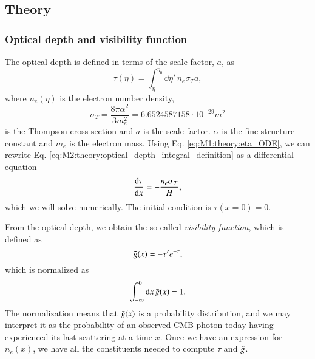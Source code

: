 

\subsection{Theory}\label{ssec:M2:theory}

\subsubsection{Optical depth and visibility function} \label{sssec:M2:optical_depth_and_visibility_function}

The optical depth is defined in terms of the scale factor, $a$, as 
\begin{equation} \label{eq:M2:theory:optical_depth_integral_definition}
    \tau(\eta) = \int_\eta^{\eta_0} \dd \eta' \,n_e \sigma_T a,
\end{equation}
where $n_e(\eta)$ is the electron number density,
\begin{equation} \label{eq:M2:theory:thomspon_cross_section}
    \sigma_T=\frac{8\pi\alpha^2}{3 m_e^2} = 6.6524587158\cdot 10^{-29}\unit{m^2} 
\end{equation}
is the Thompson cross-section and $a$ is the scale factor. $\alpha$ is the fine-structure constant and $m_e$ is the electron mass. Using Eq. \eqref{eq:M1:theory:eta_ODE}, we can rewrite Eq. \eqref{eq:M2:theory:optical_depth_integral_definition} as a differential equation 
\begin{equation} \label{eq:M2:theory:tau_ODE}
    \dv{\tau}{x} = - \frac{n_e \sigma_T}{H},
\end{equation}
which we will solve numerically. The initial condition is $\tau(x=0)=0$.

From the optical depth, we obtain the so-called \textit{visibility function}, which is defined as 
\begin{equation} \label{eq:M2:theory:g_tilde_of_x_definition}
    \tilde{g}(x) = -\tau' e^{-\tau},
\end{equation}
which is normalized as 
\begin{equation} \label{eq:M2:theory:g_tilde_normalization}
    \int_{-\infty}^0\dd x\,\tilde{g}(x) = 1.
\end{equation}
The normalization means that $\tilde{g}(x)$ is a probability distribution, and we may interpret it as the probability of an observed CMB photon today having experienced its last scattering at a time $x$.  Once we have an expression for $n_e(x)$, we have all the constituents needed 
to compute $\tau$ and $\tilde{g}$.

